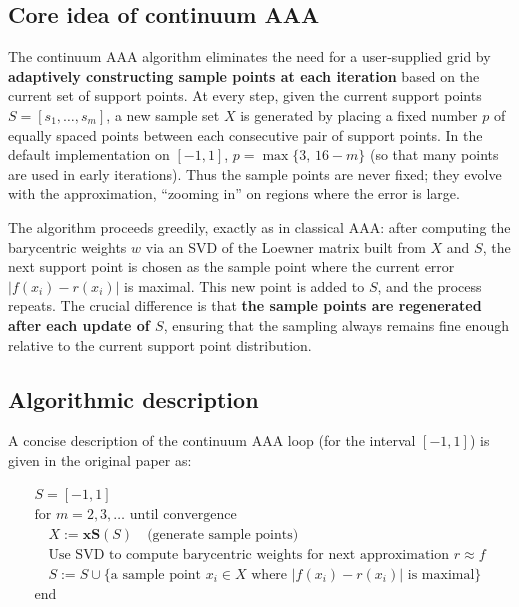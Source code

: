 \documentclass{article}
\begin{document}
\subsection{Core idea of continuum AAA}

The continuum AAA algorithm eliminates the need for a user‑supplied grid by \textbf{adaptively constructing sample points at each iteration} based on the current set of support points. At every step, given the current support points \(S = [s_1,\dots,s_m]\), a new sample set \(X\) is generated by placing a fixed number \(p\) of equally spaced points between each consecutive pair of support points. In the default implementation on \([-1,1]\), \(p = \max\{3,\,16-m\}\) (so that many points are used in early iterations). Thus the sample points are never fixed; they evolve with the approximation, ``zooming in'' on regions where the error is large.

The algorithm proceeds greedily, exactly as in classical AAA: after computing the barycentric weights \(w\) via an SVD of the Loewner matrix built from \(X\) and \(S\), the next support point is chosen as the sample point where the current error \(|f(x_i)-r(x_i)|\) is maximal. This new point is added to \(S\), and the process repeats. The crucial difference is that \textbf{the sample points are regenerated after each update of \(S\)}, ensuring that the sampling always remains fine enough relative to the current support point distribution.

\subsection{Algorithmic description}

A concise description of the continuum AAA loop (for the interval \([-1,1]\)) is given in the original paper as:

\[
\begin{array}{l}
S = [-1,1] \\
\text{for } m=2,3,\ldots \text{ until convergence} \\
\quad X := \mathbf{xS}(S) \quad \text{(generate sample points)} \\
\quad \text{Use SVD to compute barycentric weights for next approximation } r \approx f \\
\quad S := S \cup \{\text{a sample point } x_i\in X \text{ where } |f(x_i)-r(x_i)| \text{ is maximal}\} \\
\text{end}
\end{array}
\]
\end{document}
